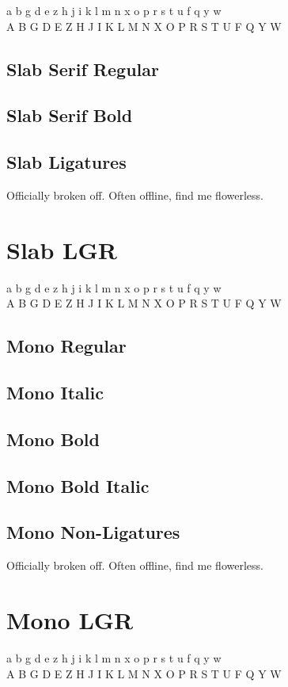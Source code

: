 \documentclass{article}
\begin{document}
{\robotolgr\robotocondensed\noindent
 a b g d e z h j i k l m n x o p r s t u f q y w\\
 A B G D E Z H J I K L M N X O P R S T U F Q Y W\\
}


\subsection*{Slab Serif Regular}
{\robotoslab\lipsum[1]}


\subsection*{Slab Serif Bold}

{\robotoslab\textbf{\lipsum[3]}}

\subsection*{Slab Ligatures}


{\robotoslab Officially broken off. Often offline, find me flowerless.}


\section*{Slab LGR}


{\robotoslablgr\noindent
 a b g d e z h j i k l m n x o p r s t u f q y w\\
 A B G D E Z H J I K L M N X O P R S T U F Q Y W\\
}


\subsection*{Mono Regular}
\texttt{\lipsum[1]}

\subsection*{Mono Italic}
\texttt{\textit{\lipsum[2]}}

\subsection*{Mono Bold}

\texttt{\textbf{\lipsum[3]}}



\subsection*{Mono Bold Italic}

\texttt{\textbf{\textit{\lipsum[4]}}}

\subsection*{Mono Non-Ligatures}


{\robotomono Officially broken off. Often offline, find me flowerless.}


\section*{Mono LGR}


{\robotomonolgr\noindent
 a b g d e z h j i k l m n x o p r s t u f q y w\\
 A B G D E Z H J I K L M N X O P R S T U F Q Y W\\
}
\end{document}
